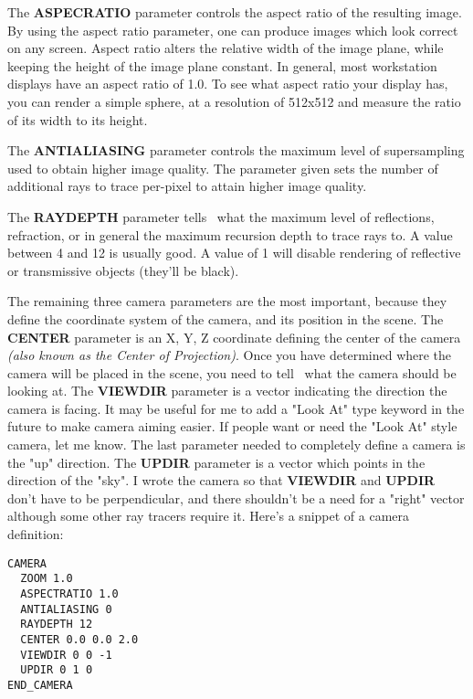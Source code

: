   The {\bf ASPECRATIO} parameter controls the aspect ratio of the resulting
image.  By using the aspect ratio parameter, one can produce images which
look correct on any screen.  Aspect ratio alters the relative width of the
image plane, while keeping the height of the image plane constant.  In 
general, most workstation displays have an aspect ratio of 1.0.  To see
what aspect ratio your display has, you can render a simple sphere, at 
a resolution of 512x512 and measure the ratio of its width to its height. 

The {\bf ANTIALIASING} parameter controls the maximum level of supersampling
used to obtain higher image quality.  The parameter given sets the number of
additional rays to trace per-pixel to attain higher image quality.

  The {\bf RAYDEPTH} parameter tells \RAY\ what the maximum
level of reflections, refraction, or in general the maximum recursion
depth to trace rays to.  A value between 4 and 12 is usually good.  A
value of 1 will disable rendering of reflective or transmissive 
objects (they'll be black). 

  The remaining three camera parameters are the most important, because
they define the coordinate system of the camera, and its position in the
scene.  The {\bf CENTER} parameter is an X, Y, Z coordinate defining the 
center of the camera {\em (also known as the Center of Projection)}.
Once you have determined where the camera will be placed in the scene, you
need to tell \RAY\ what the camera should be looking at.  The
{\bf VIEWDIR} parameter is a vector indicating the direction the camera
is facing.  It may be useful for me to add a "Look At" type keyword in
the future to make camera aiming easier.  If people want or need the
"Look At" style camera, let me know.  The last parameter needed to completely
define a camera is the "up" direction.  The {\bf UPDIR} parameter is a vector
which points in the direction of the "sky".  I wrote the camera so that
{\bf VIEWDIR} and {\bf UPDIR} don't have to be perpendicular, and there
shouldn't be a need for a "right" vector although some other ray tracers 
require it.  Here's a snippet of a camera definition:
\begin{verbatim}
CAMERA
  ZOOM 1.0
  ASPECTRATIO 1.0
  ANTIALIASING 0
  RAYDEPTH 12
  CENTER 0.0 0.0 2.0
  VIEWDIR 0 0 -1 
  UPDIR 0 1 0
END_CAMERA 
\end{verbatim}


